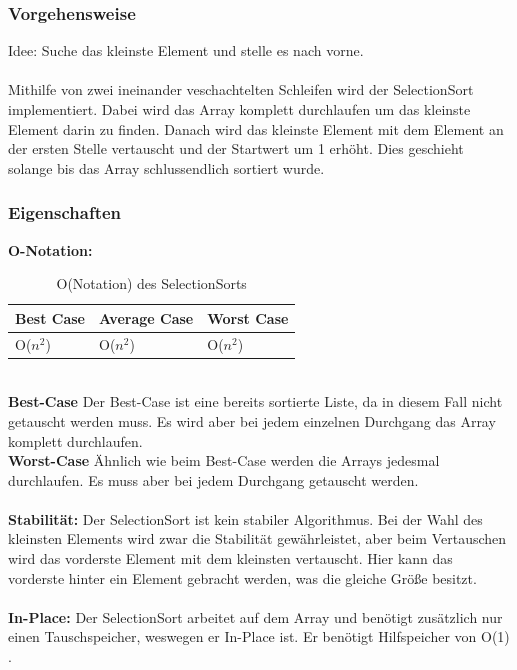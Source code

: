 \documentclass{article}
\begin{document}
\subsubsection{Vorgehensweise}
Idee: Suche das kleinste Element und stelle es nach vorne. \\ \\
Mithilfe von zwei ineinander veschachtelten Schleifen wird der SelectionSort implementiert. Dabei wird das Array komplett durchlaufen um das kleinste Element darin zu finden. Danach wird das kleinste Element mit dem Element an der ersten Stelle vertauscht und der Startwert um 1 erhöht. Dies geschieht solange bis das Array schlussendlich sortiert wurde.
\subsubsection{Eigenschaften}
\textbf{O-Notation:}
\begin{table}[h]
\centering
\begin{tabular}{lll}
	\hline
	\textbf{Best Case} & \textbf{Average Case} & \textbf{Worst Case} \\
	\hline
	O($n^{2}$) & O($n^{2}$) & O($n^{2}$) \\
	\hline
\end{tabular}
\caption{O(Notation) des SelectionSorts \cite{India2015Dataset}}
\label{tab:SelectionSort}
\end{table}
\\
\textbf{Best-Case} Der Best-Case ist eine bereits sortierte Liste, da in diesem Fall nicht getauscht werden muss. Es wird aber bei jedem einzelnen Durchgang das Array komplett durchlaufen. \\
\textbf{Worst-Case} Ähnlich wie beim Best-Case werden die Arrays jedesmal durchlaufen. Es muss aber bei jedem Durchgang getauscht werden.\\ \\
\textbf{Stabilität:} Der SelectionSort ist kein stabiler Algorithmus. Bei der Wahl des kleinsten Elements wird zwar die Stabilität gewährleistet, aber beim Vertauschen wird das vorderste Element mit dem kleinsten vertauscht. Hier kann das vorderste hinter ein Element gebracht werden, was die gleiche Größe besitzt.   \\
\\
\textbf{In-Place:}  Der SelectionSort arbeitet auf dem Array und benötigt zusätzlich nur einen Tauschspeicher, weswegen er In-Place ist. Er benötigt Hilfspeicher von O(1) \cite{India2015Dataset}. \\
\end{document}
